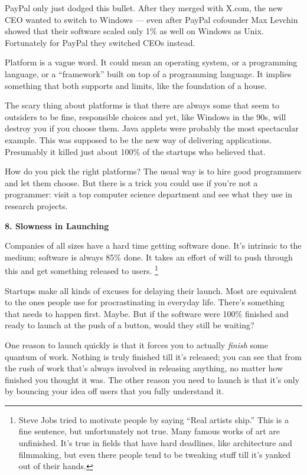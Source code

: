\documentclass[12pt]{book}
\begin{document}
PayPal only just dodged this bullet. After they merged with X.com, the
new CEO wanted to switch to Windows --- even after PayPal cofounder Max
Levchin showed that their software scaled only 1\% as well on Windows as
Unix. Fortunately for PayPal they switched CEOs instead.

Platform is a vague word. It could mean an operating system, or a
programming language, or a ``framework'' built on top of a programming
language. It implies something that both supports and limits, like the
foundation of a house.

The scary thing about platforms is that there are always some that seem
to outsiders to be fine, responsible choices and yet, like Windows in
the 90s, will destroy you if you choose them. Java applets were probably
the most spectacular example. This was supposed to be the new way of
delivering applications. Presumably it killed just about 100\% of the
startups who believed that.

How do you pick the right platforms? The usual way is to hire good
programmers and let them choose. But there is a trick you could use if
you're not a programmer: visit a top computer science department and see
what they use in research projects.

\textbf{8. Slowness in Launching}

Companies of all sizes have a hard time getting software done. It's
intrinsic to the medium; software is always 85\% done. It takes an
effort of will to push through this and get something released to users.
\footnote{Steve Jobs tried to motivate people by saying ``Real artists
ship.'' This is a fine sentence, but unfortunately not true. Many famous
works of art are unfinished. It's true in fields that have hard
deadlines, like architecture and filmmaking, but even there people tend
to be tweaking stuff till it's yanked out of their hands.}

Startups make all kinds of excuses for delaying their launch. Most are
equivalent to the ones people use for procrastinating in everyday life.
There's something that needs to happen first. Maybe. But if the software
were 100\% finished and ready to launch at the push of a button, would
they still be waiting?

One reason to launch quickly is that it forces you to actually
\emph{finish} some quantum of work. Nothing is truly finished till it's
released; you can see that from the rush of work that's always involved
in releasing anything, no matter how finished you thought it was. The
other reason you need to launch is that it's only by bouncing your idea
off users that you fully understand it.
\end{document}
